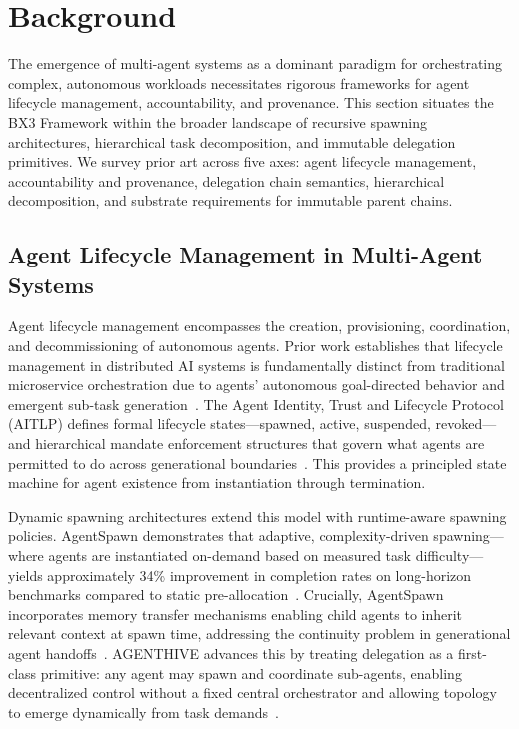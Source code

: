 \section{Background}

The emergence of multi-agent systems as a dominant paradigm for orchestrating complex, autonomous workloads necessitates rigorous frameworks for agent lifecycle management, accountability, and provenance. This section situates the BX3 Framework within the broader landscape of recursive spawning architectures, hierarchical task decomposition, and immutable delegation primitives. We survey prior art across five axes: agent lifecycle management, accountability and provenance, delegation chain semantics, hierarchical decomposition, and substrate requirements for immutable parent chains.

\subsection{Agent Lifecycle Management in Multi-Agent Systems}

Agent lifecycle management encompasses the creation, provisioning, coordination, and decommissioning of autonomous agents. Prior work establishes that lifecycle management in distributed AI systems is fundamentally distinct from traditional microservice orchestration due to agents' autonomous goal-directed behavior and emergent sub-task generation~\cite{aitlp-draft}. The Agent Identity, Trust and Lifecycle Protocol (AITLP) defines formal lifecycle states---spawned, active, suspended, revoked---and hierarchical mandate enforcement structures that govern what agents are permitted to do across generational boundaries~\cite{aitlp-draft}. This provides a principled state machine for agent existence from instantiation through termination.

Dynamic spawning architectures extend this model with runtime-aware spawning policies. AgentSpawn demonstrates that adaptive, complexity-driven spawning---where agents are instantiated on-demand based on measured task difficulty---yields approximately 34\% improvement in completion rates on long-horizon benchmarks compared to static pre-allocation~\cite{agentspawn}. Crucially, AgentSpawn incorporates memory transfer mechanisms enabling child agents to inherit relevant context at spawn time, addressing the continuity problem in generational agent handoffs~\cite{agentspawn}. AGENTHIVE advances this by treating delegation as a first-class primitive: any agent may spawn and coordinate sub-agents, enabling decentralized control without a fixed central orchestrator and allowing topology to emerge dynamically from task demands~\cite{agenthive}.

